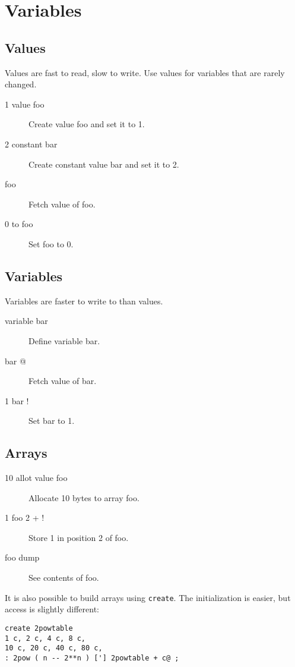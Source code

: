 \section{Variables}

\subsection{Values}

Values are fast to read, slow to write. Use values for variables
that are rarely changed. 

\begin{description}
\item[1 value foo] Create value foo and set it to 1.
\item[2 constant bar] Create constant value bar and set it to 2.
\item[foo] Fetch value of foo.
\item[0 to foo] Set foo to 0.
\end{description}

\subsection{Variables}

Variables are faster to write to than values.

\begin{description}
\item[variable bar] Define variable bar.
\item[bar @] Fetch value of bar.
\item[1 bar !] Set bar to 1.
\end{description}

\subsection{Arrays}

\begin{description}
\item[10 allot value foo] Allocate 10 bytes to array foo.
\item[1 foo 2 + !] Store 1 in position 2 of foo.
\item[foo dump] See contents of foo.
\end{description}

It is also possible to build arrays using \texttt{create}. The initialization is easier, but access is slightly different:

\begin{verbatim}
create 2powtable
1 c, 2 c, 4 c, 8 c,
10 c, 20 c, 40 c, 80 c,
: 2pow ( n -- 2**n ) ['] 2powtable + c@ ;
\end{verbatim}

